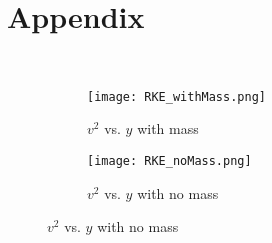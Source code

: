 \documentclass[12pt]{article}
\begin{document}
\section{Appendix}\

\begin{figure} [p]
    \begin{subfigure}
        \centering
        \texttt{[image: RKE\_withMass.png]}
        \caption{$v^2$ vs. $y$ with mass}
        \label{Massed Plot}
    \end{subfigure}
    \begin{subfigure}
        \centering
        \texttt{[image: RKE\_noMass.png]}
        \caption{$v^2$ vs. $y$ with no mass}
        \label{Massless Plot}
    \end{subfigure}
    
\end{figure}
\end{document}
